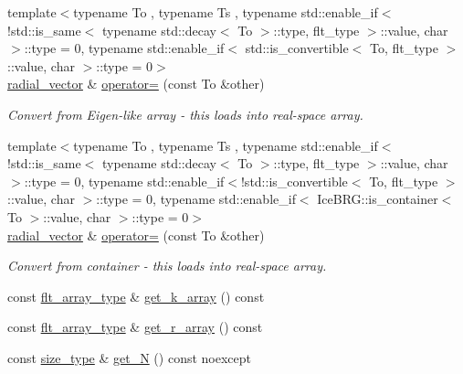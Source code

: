 \begin{DoxyCompactItemize}
{\footnotesize template$<$typename To , typename Ts , typename std\+::enable\+\_\+if$<$!std\+::is\+\_\+same$<$ typename std\+::decay$<$ To $>$\+::type, flt\+\_\+type $>$\+::value, char $>$\+::type  = 0, typename std\+::enable\+\_\+if$<$ std\+::is\+\_\+convertible$<$ To, flt\+\_\+type $>$\+::value, char $>$\+::type  = 0$>$ }\\\hyperlink{classIceBRG_1_1Fourier_1_1radial__vector}{radial\+\_\+vector} \& \hyperlink{classIceBRG_1_1Fourier_1_1radial__vector_a097911a84ad4d039e06a08c7ed04769b}{operator=} (const To \&other)
\begin{DoxyCompactList}\small\item\em Convert from Eigen-\/like array -\/ this loads into real-\/space array. \end{DoxyCompactList}\item 
{\footnotesize template$<$typename To , typename Ts , typename std\+::enable\+\_\+if$<$!std\+::is\+\_\+same$<$ typename std\+::decay$<$ To $>$\+::type, flt\+\_\+type $>$\+::value, char $>$\+::type  = 0, typename std\+::enable\+\_\+if$<$!std\+::is\+\_\+convertible$<$ To, flt\+\_\+type $>$\+::value, char $>$\+::type  = 0, typename std\+::enable\+\_\+if$<$ Ice\+B\+R\+G\+::is\+\_\+container$<$ To $>$\+::value, char $>$\+::type  = 0$>$ }\\\hyperlink{classIceBRG_1_1Fourier_1_1radial__vector}{radial\+\_\+vector} \& \hyperlink{classIceBRG_1_1Fourier_1_1radial__vector_af4d180769e6d4f9460865680518a71b1}{operator=} (const To \&other)
\begin{DoxyCompactList}\small\item\em Convert from container -\/ this loads into real-\/space array. \end{DoxyCompactList}\item 
const \hyperlink{namespaceIceBRG_acdca5c05302480eba6ba053449643a6d}{flt\+\_\+array\+\_\+type} \& \hyperlink{classIceBRG_1_1Fourier_1_1radial__vector_a9288163a5abd0237f5d08b5d63e47e6f}{get\+\_\+k\+\_\+array} () const 
\item 
const \hyperlink{namespaceIceBRG_acdca5c05302480eba6ba053449643a6d}{flt\+\_\+array\+\_\+type} \& \hyperlink{classIceBRG_1_1Fourier_1_1radial__vector_a7cf76957d0f50de17ed4b961cb6139e5}{get\+\_\+r\+\_\+array} () const 
\item 
const \hyperlink{lib_2IceBRG__main_2common_8h_a566c61f2ca17211f4ba8557f3f65e8d3}{size\+\_\+type} \& \hyperlink{classIceBRG_1_1Fourier_1_1radial__vector_a1f25ebb018c9b82d54fd9d5dbc8d20e7}{get\+\_\+\+N} () const  noexcept
\item 

\end{DoxyCompactItemize}
